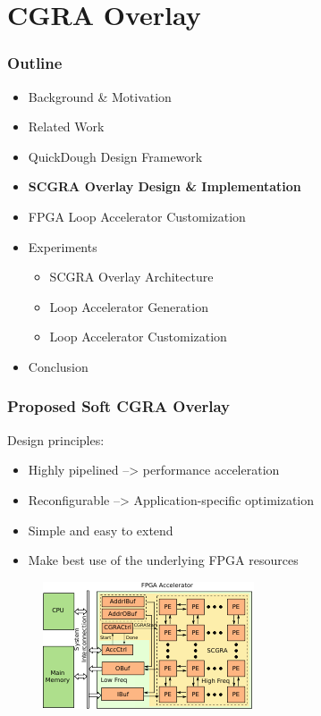 \documentclass[accentcolor=tud1a,colorbacktitle,inverttitle,landscape,german,presentation,t]{tudbeamer}
\begin{document}
\section{CGRA Overlay}
  \begin{frame}
  \frametitle{Outline}
  \begin{itemize}
  \setlength{\itemsep}{6pt}
  \item Background \& Motivation
  \item Related Work
  \item QuickDough Design Framework
  \item \textbf{SCGRA Overlay Design \& Implementation}
  \item FPGA Loop Accelerator Customization
  \item Experiments
  \begin{itemize}
    \setlength{\itemsep}{6pt}
    \item SCGRA Overlay Architecture
    \item Loop Accelerator Generation
    \item Loop Accelerator Customization
  \end{itemize}
  \item Conclusion
  \end{itemize}
  \end{frame}

  \begin{frame}
  \frametitle{Proposed Soft CGRA Overlay}
  Design principles:
  \begin{itemize}
  \item Highly pipelined --> performance acceleration
  \item Reconfigurable --> Application-specific optimization
  \item Simple and easy to extend
  \item Make best use of the underlying FPGA resources
  \end{itemize}

  \begin{figure}
     \includegraphics[width=.6\linewidth]{scgra-accelerator}
  \end{figure}
  \end{frame}
\end{document}
